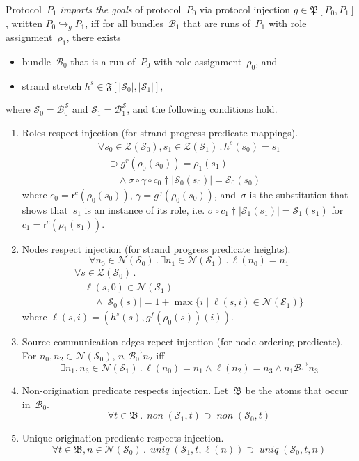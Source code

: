 \documentclass[12pt]{article}
\newcommand{\fn}[1]{\ensuremath{\operatorname{\mathit{#1}}}}
\newcommand{\prefix}[2]{#1\dagger#2}
\newcommand{\all}[1]{\forall#1\mathpunct.}
\newcommand{\some}[1]{\exists#1\mathpunct.}
\newcommand{\alg}[1]{\ensuremath{\mathfrak{#1}}}
\newcommand{\atm}{\alg{B}}
\newcommand{\ssp}{\ensuremath{\mathcal{S}}}
\newcommand{\bun}{\ensuremath{\mathcal{B}}}
\newcommand{\strands}{\ensuremath{\mathcal{Z}}}
\newcommand{\nodes}{\ensuremath{\mathcal{N}}}
\newcommand{\rl}{\ensuremath{\rho}}
\newcommand{\role}{\mathsf{r}}
\begin{document}
Protocol~$P_1$ \emph{imports the goals} of protocol~$P_0$ via
protocol injection $g\in\alg{P}[P_0,P_1]$, written
$P_0\hookrightarrow_g P_1$, iff for all bundles~$\bun_1$ that are runs
of~$P_1$ with role assignment~$\rl_1$, there exists
\begin{itemize}
\item bundle~$\bun_0$ that is a run of~$P_0$ with role
  assignment~$\rl_0$, and
\item strand stretch $h^s\in\alg{F}[|\ssp_0|, |\ssp_1|]$,
\end{itemize}
where $\ssp_0=\bun^\ssp_0$ and $\ssp_1=\bun^\ssp_1$, and the following
conditions hold.
\begin{enumerate}

\item\label{item: role mappings} Roles respect injection (for strand
  progress predicate mappings).
  \[\begin{array}{l}
  \all{s_0\in\strands(\ssp_0),s_1\in\strands(\ssp_1)}h^s(s_0) =
  s_1\\ \quad\supset
  g^r(\rl_0(s_0))=\rl_1(s_1)\\ \qquad{}\land\sigma\circ
  \gamma\circ\prefix{c_0}{|\ssp_0(s_0)|}
  = \ssp_0(s_0)
  \end{array}\]
  where $c_0=\role^c(\rl_0(s_0))$,
  $\gamma=g^\gamma(\rl_0(s_0))$, and~$\sigma$ is the substitution that
  shows that~$s_1$ is an instance of its role, i.e.\@
  $\sigma\circ\prefix{c_1}{|\ssp_1(s_1)|}=\ssp_1(s_1)$ for
  $c_1=\role^c(\rl_1(s_1))$.

\item\label{item: role heights} Nodes respect injection (for strand
  progress predicate heights).
  \[\all{n_0\in\nodes(\ssp_0)}\some{n_1\in\nodes(\ssp_1)}\ell(n_0)=n_1\]
  \[\begin{array}{l}
  \all{s\in\strands(\ssp_0)}\\
  \quad\ell(s,0)\in\nodes(\ssp_1)\\
  \qquad{}\land|\ssp_0(s)|=1+\max
  \{i\mid\ell(s,i)\in\nodes(\ssp_1)\}
  \end{array}\]
  where $\ell(s,i)=(h^s(s),g^f(\rl_0(s))(i))$.

\item\label{item: node orderings} Source communication edges repect
  injection (for node ordering predicate).  For
  $n_0,n_2\in\nodes(\ssp_0)$, $n_0\mathbin{\bun^\to_0} n_2$ iff
  \[\some{n_1,n_3\in\nodes(\ssp_1)}\ell(n_0)=n_1\land\ell(n_2)=n_3\land
  n_1\mathbin{\bun^\to_1} n_3\]

\item\label{item: nons} Non-origination predicate respects injection.
  Let~$\atm$ be the atoms that occur in~$\bun_0$.
  \[\all{t\in\atm}\fn{non}(\ssp_1, t)\supset\fn{non}(\ssp_0, t)\]

\item\label{item: uniques} Unique origination predicate respects injection.
  \[\all{t\in\atm,n\in\nodes(\ssp_0)}\fn{uniq}(\ssp_1,
  t,\ell(n))\supset\fn{uniq}(\ssp_0, t,n)\]
\end{enumerate}
\end{document}
